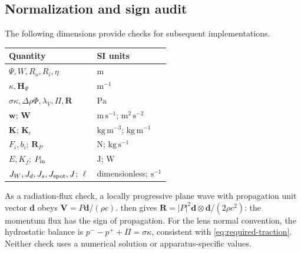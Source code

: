 \subsection{Normalization and sign audit}
The following dimensions provide checks for subsequent implementations.
\begin{center}
\begin{tabular}{@{}ll@{}}
\toprule Quantity & SI units \\\midrule
$\Psi,W,R_o,R_i,\eta$ & $\mathrm m$\\
$\kappa,\bm H_\Psi$ & $\mathrm{m^{-1}}$\\
$\sigma\kappa,\Delta\rho\Phi,\lambda_V,\Pi,\bm R$ & $\mathrm{Pa}$\\
$\bm w$; $\bm W$ & $\mathrm{m\,s^{-1}}$; $\mathrm{m^2\,s^{-2}}$\\
$\bm K$; $\bm K_i$ & $\mathrm{kg\,m^{-3}}$; $\mathrm{kg\,m^{-1}}$\\
$F_i,b_i$; $\bm R_P$ & $\mathrm N$; $\mathrm{kg\,s^{-1}}$\\
$E,K_f$; $P_{\rm in}$ & $\mathrm J$; $\mathrm W$\\
$J_W,J_d,J_s,J_{\rm spot},J$; $\ell$ & dimensionless; $\mathrm{s^{-1}}$\\
\bottomrule
\end{tabular}
\end{center}
As a radiation-flux check, a locally progressive plane wave with propagation
unit vector $\bm d$ obeys $\bm V=P\bm d/(\rho c)$.  then gives
$\bm R=|P|^2\bm d\otimes\bm d/(2\rho c^2)$: the momentum flux has the sign
of propagation. For the lens normal convention, the hydrostatic balance is
$p^- -p^++\Pi=\sigma\kappa$, consistent with
\cref{eq:required-traction}. Neither check uses a numerical solution or
apparatus-specific values.
